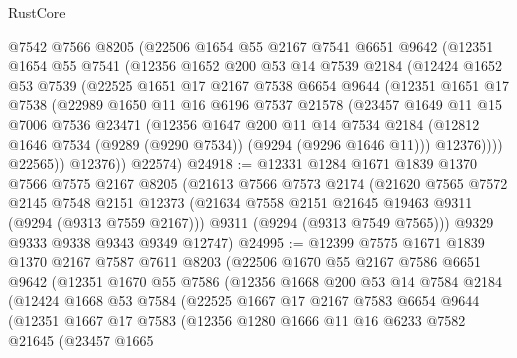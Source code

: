 \begin{lexlean}{RustCore}
\begin{coremodule}
    @7542
    @7566
    @8205
    (@22506
      @1654
      @55
      @2167
      @7541
      @6651
      @9642
      (@12351
        @1654
        @55
        @7541
        (@12356
          @1652
          @200
          @53
          @14
          @7539
          @2184
          (@12424
            @1652
            @53
            @7539
            (@22525
              @1651
              @17
              @2167
              @7538
              @6654
              @9644
              (@12351
                @1651
                @17
                @7538
                (@22989
                  @1650
                  @11
                  @16
                  @6196
                  @7537
                  @21578
                  (@23457
                    @1649
                    @11
                    @15
                    @7006
                    @7536
                    @23471
                    (@12356
                      @1647
                      @200
                      @11
                      @14
                      @7534
                      @2184
                      (@12812 @1646 @7534 (@9289 (@9290 @7534)) (@9294 (@9296 @1646 @11)))
                      @12376))))
              @22565))
          @12376))
      @22574)
@24918 := @12331
    @1284
    @1671
    @1839
    @1370
    @7566
    @7575
    @2167
    @8205
    (@21613
      @7566
      @7573
      @2174
      (@21620
        @7565
        @7572
        @2145
        @7548
        @2151
        @12373
        (@21634 @7558 @2151 @21645 @19463 @9311 (@9294 (@9313 @7559 @2167)))
        @9311
        (@9294 (@9313 @7549 @7565)))
      @9329
      @9333
      @9338
      @9343
      @9349
      @12747)
@24995 := @12399
    @7575
    @1671
    @1839
    @1370
    @2167
    @7587
    @7611
    @8203
    (@22506
      @1670
      @55
      @2167
      @7586
      @6651
      @9642
      (@12351
        @1670
        @55
        @7586
        (@12356
          @1668
          @200
          @53
          @14
          @7584
          @2184
          (@12424
            @1668
            @53
            @7584
            (@22525
              @1667
              @17
              @2167
              @7583
              @6654
              @9644
              (@12351
                @1667
                @17
                @7583
                (@12356
                  @1280
                  @1666
                  @11
                  @16
                  @6233
                  @7582
                  @21645
                  (@23457
                    @1665

\end{coremodule}
\end{lexlean}
